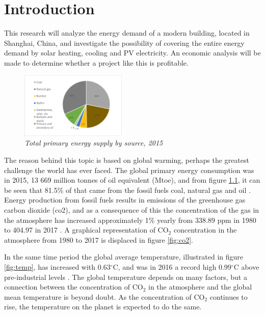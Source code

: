 \chapter{Introduction}

This research will analyze the energy demand of a modern building, located in Shanghai, China, and investigate the possibility of covering the entire energy demand by solar heating, cooling and PV electricity. An economic analysis will be made to determine whether a project like this is profitable.
\begin{figure}
    \centering
    \vspace{3mm}
    \includegraphics[width=0.45\textwidth]{vedlegg/TPESnew}
    \caption{\textit{Total primary energy supply by source, 2015}}
     \vspace{-6mm}
    \label{fig:TPES}
\end{figure}

The reason behind this topic is based on global warming, perhaps the greatest challenge the world has ever faced. The global primary energy consumption was in 2015, 13 669 million tonnes of oil equivalent (\ac{Mtoe}), and from figure \ref{fig:TPES}, it can be seen that 81.5\% of that came from the fossil fuels coal, natural gas and oil \cite{stats}. Energy production from fossil fuels results in emissions of the greenhouse gas carbon dioxide (\ac{co2}), and as a consequence of this the concentration of the gas in the atmosphere has increased approximately 1\% yearly from 338.89 ppm in 1980 to 404.97 in 2017 \cite{co2levels}. A graphical representation of CO$_2$ concentration in the atmosphere from 1980 to 2017 is displaced in figure \ref{fig:co2}. 

In the same time period the global average temperature, illustrated in figure \ref{fig:temp}, has increased with 0.63$^\circ$C, and was in 2016 a record high 0.99$^\circ$C above pre-industrial levels \cite{temp}. The global temperature depends on many factors, but a connection between the concentration of CO$_2$ in the atmosphere and the global mean temperature is beyond doubt. As the concentration of CO$_2$ continues to rise, the temperature on the planet is expected to do the same. 

